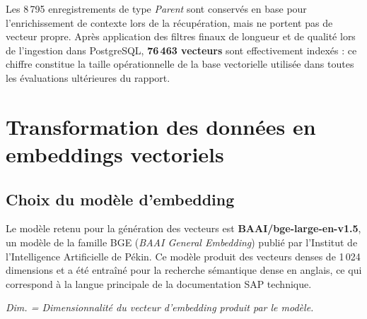 Les 8\,795 enregistrements de type \textit{Parent} sont conservés en base pour l'enrichissement de contexte lors de la récupération, mais ne portent pas de vecteur propre. Après application des filtres finaux de longueur et de qualité lors de l'ingestion dans PostgreSQL, \textbf{76\,463 vecteurs} sont effectivement indexés : ce chiffre constitue la taille opérationnelle de la base vectorielle utilisée dans toutes les évaluations ultérieures du rapport.



\section{Transformation des données en embeddings vectoriels}
\label{sec:embeddings}

\subsection{Choix du modèle d'embedding}

Le modèle retenu pour la génération des vecteurs est \textbf{BAAI/bge-large-en-v1.5}, un
modèle de la famille BGE (\textit{BAAI General Embedding}) publié par l'Institut de
l'Intelligence Artificielle de Pékin. Ce modèle produit des vecteurs denses de 1\,024
dimensions et a été entraîné pour la recherche sémantique dense en anglais, ce qui
correspond à la langue principale de la documentation SAP technique.

\begin{table}[H]
\centering
\caption{Comparaison des modèles d'embedding évalués}
\label{tab:modeles-embedding}
\smallskip

\footnotesize\textit{Dim. = Dimensionnalité du vecteur d'embedding produit par le modèle.}
\end{table}

